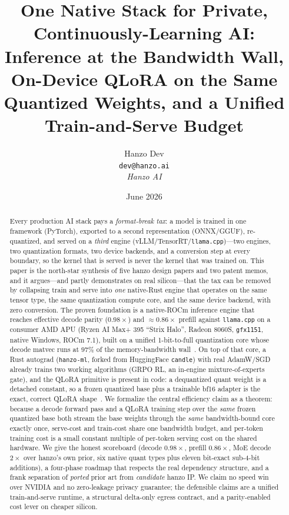\documentclass[11pt]{article}
\title{One Native Stack for Private, Continuously-Learning AI: Inference at the Bandwidth Wall, On-Device QLoRA on the Same Quantized Weights, and a Unified Train-and-Serve Budget}
\author{Hanzo Dev \\ \texttt{dev@hanzo.ai} \\ \textit{Hanzo AI}}
\date{June 2026}
\begin{document}
\hanzocoverpage

\begin{abstract}
Every production AI stack pays a \emph{format-break tax}: a model is trained in one framework (PyTorch), exported to a second representation (ONNX/GGUF), re-quantized, and served on a \emph{third} engine (vLLM/TensorRT/\texttt{llama.cpp})---two engines, two quantization formats, two device backends, and a conversion step at every boundary, so the kernel that is served is never the kernel that was trained on. This paper is the north-star synthesis of five hanzo design papers and two patent memos, and it argues---and partly demonstrates on real silicon---that the tax can be removed by collapsing train and serve into \emph{one} native-Rust engine that operates on the same tensor type, the same quantization compute core, and the same device backend, with zero conversion. The proven foundation is a native-ROCm inference engine that reaches effective decode parity ($0.98\times$) and $\approx 0.86\times$ prefill against \texttt{llama.cpp} on a consumer AMD APU (Ryzen AI Max+ 395 ``Strix Halo'', Radeon 8060S, \texttt{gfx1151}, native Windows, ROCm 7.1), built on a unified 1-bit-to-full quantization core whose decode matvec runs at $97\%$ of the memory-bandwidth wall~\cite{hanzo-rocm}. On top of that core, a Rust autograd (\texttt{hanzo-ml}, forked from HuggingFace \texttt{candle}) with real AdamW/SGD already trains two working algorithms (GRPO RL, an in-engine mixture-of-experts gate), and the QLoRA primitive is present in code: a dequantized quant weight is a detached constant, so a frozen quantized base plus a trainable bf16 adapter is the exact, correct QLoRA shape~\cite{hanzo-train}. We formalize the central efficiency claim as a theorem: because a decode forward pass and a QLoRA training step over the \emph{same} frozen quantized base both stream the base weights through the \emph{same} bandwidth-bound core exactly once, serve-cost and train-cost share one bandwidth budget, and per-token training cost is a small constant multiple of per-token serving cost on the shared hardware. We give the honest scoreboard (decode $0.98\times$, prefill $0.86\times$, MoE decode $2\times$ over hanzo's own prior, six native quant types plus eleven bit-exact sub-4-bit additions), a four-phase roadmap that respects the real dependency structure, and a frank separation of \emph{ported} prior art from \emph{candidate} hanzo IP. We claim no speed win over NVIDIA and no zero-leakage privacy guarantee; the defensible claims are a unified train-and-serve runtime, a structural delta-only egress contract, and a parity-enabled cost lever on cheaper silicon.
\end{abstract}
\end{document}
